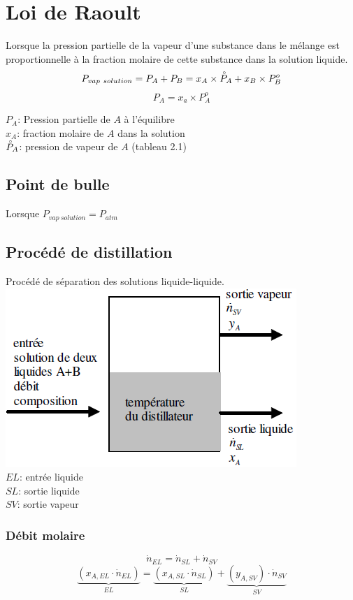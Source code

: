 \documentclass[twocolumn,letterpaper,8pt]{extarticle}
\begin{document}
\section{Loi de Raoult}
Lorsque la pression partielle de la vapeur d'une substance dans le mélange est proportionnelle à la fraction molaire de cette substance dans la solution liquide.
$$P_{vap\ solution}=P_A+P_B=x_A \times \accentset{\circ}{P}_A + x_B \times P^o_B$$
$$P_A=x_a \times P^o_A$$

$P_A$: Pression partielle de $A$ à l'équilibre\\
$x_A$: fraction molaire de $A$ dans la solution\\
$\accentset{\circ}{P}_A$: pression de vapeur de $A$ (tableau 2.1)

\subsection{Point de bulle}
Lorsque $P_{vap\ solution}=P_{atm}$

\subsection{Procédé de distillation}
Procédé de séparation des solutions liquide-liquide.\\

\includegraphics[scale=0.5]{images/distillation.png}\\
$EL$: entrée liquide\\
$SL$: sortie liquide\\
$SV$: sortie vapeur

\subsubsection{Débit molaire}
$$\dot{n}_{EL}= \dot{n}_{SL} + \dot{n}_{SV}$$
$$\underbrace{(x_{A,EL}\cdot \dot{n}_{EL})}_{EL} = \underbrace{(x_{A,SL} \cdot \dot{n}_{SL})}_{SL} + \underbrace{(y_{A,SV})\cdot \dot{n}_{SV}}_{SV}$$
\end{document}
